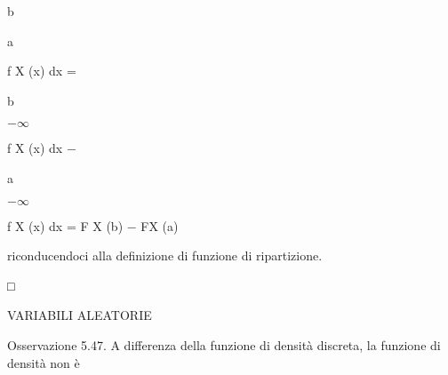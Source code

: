 \documentclass[a4paper,portrait,12pt]{article}
\begin{document}
\begin{flushleft}
b
\end{flushleft}


\begin{flushleft}
a
\end{flushleft}





\begin{flushleft}
f X (x) dx =
\end{flushleft}





\begin{flushleft}
b
\end{flushleft}


$-$$\infty$





\begin{flushleft}
f X (x) dx $-$
\end{flushleft}





\begin{flushleft}
a
\end{flushleft}


$-$$\infty$





\begin{flushleft}
f X (x) dx = F X (b) $-$ FX (a)
\end{flushleft}





\begin{flushleft}
riconducendoci alla definizione di funzione di ripartizione.
\end{flushleft}





□










\begin{flushleft}
VARIABILI ALEATORIE
\end{flushleft}





\begin{flushleft}
Osservazione 5.47. A differenza della funzione di densit\`{a} discreta, la funzione di densit\`{a} non \`{e}
\end{flushleft}
\end{document}

